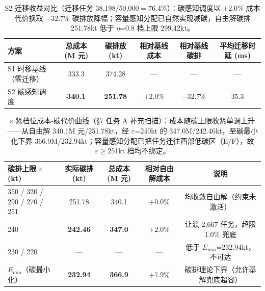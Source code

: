 
\begin{table}[h]
\centering
\footnotesize
\begin{tabular}{lccccc}
\toprule
方案 & 总成本 (M 元) & 碳排放 (kt) & 相对基线成本 & 相对基线碳排 & 平均迁移时延 (ms) \\
\midrule
S1 时移基线（零迁移） & 333.3 & 374.28 & --- & --- & --- \\
S2 碳感知调度 & \textbf{340.1} & \textbf{251.78} & $+2.0\%$ & $-32.7\%$ & 35.3 \\
\bottomrule
\end{tabular}
\caption{S2 迁移收益对比（迁移任务 38{,}198/50{,}000$=$76.4\%）：碳感知调度以 $+2.0\%$ 成本代价换取 $-32.7\%$ 碳排放降幅；容量感知分配已自然实现减碳，自由解碳排 251.78kt 低于 $\eta$=0.8 档上限 299.42kt。}
\label{tab:s2-benefit}
\end{table}

\begin{table}[h]
\centering
\footnotesize
\begin{tabular}{lcccc}
\toprule
碳排上限 $\varepsilon$ (kt) & 实际碳排 (kt) & 总成本 (M 元) & 相对自由解成本 & 说明 \\
\midrule
350 / 320 / 290 / 270 / 251 & 251.78 & 340.1 & $+0.0\%$ & 均收敛自由解（约束未激活） \\
240 & \textbf{242.46} & \textbf{347.0} & $+2.0\%$ & 让渡 2{,}667 任务，超限 1.0\% 兜底 \\
230 / 220 & --- & --- & --- & 低于 $E_{\min}$=232.94kt，不可达 \\
$E_{\min}$（碳最小化） & \textbf{232.94} & \textbf{366.9} & $+7.9\%$ & 碳排理论下界（允许基解兜底超容） \\
\bottomrule
\end{tabular}
\caption{ε 紧档位成本-碳代价曲线（§7 任务 A 补充扫描）：成本随碳上限收紧单调上升——从自由解 340.1M 元/251.78kt，经 $\varepsilon$=240kt 的 347.0M/242.46kt，至碳最小化下界 366.9M/232.94kt；容量感知分配已把任务迁往西部低碳区（E/F），故 $\varepsilon\geq$251kt 档均不绑定。}
\label{tab:s2-epsilon}
\end{table}

